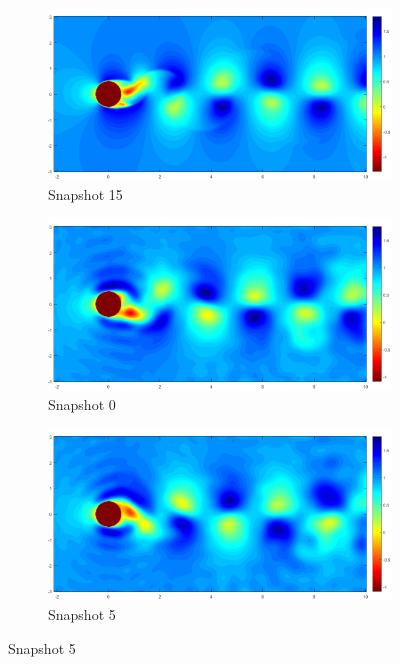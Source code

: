 \documentclass[letterpaper,12pt,peerreviewca,draftcls]{IEEEtran}
\begin{document}
\begin{figure}[h]
\begin{subfigure}[t]{0.23\textwidth}
	\end{subfigure}
	\begin{subfigure}[t]{0.23\textwidth}
		\includegraphics[width=\linewidth]{"Figure S7d"}
		\caption{Snapshot 15}
	\end{subfigure}
	\begin{subfigure}[t]{0.23\textwidth}
		\includegraphics[width=\linewidth]{"Figure S7e"}
		\caption{Snapshot 0}
	\end{subfigure}
	\begin{subfigure}[t]{0.23\textwidth}
		\includegraphics[width=\linewidth]{"Figure S7f"}
		\caption{Snapshot 5}
	\end{subfigure}

\end{figure}
\end{document}
